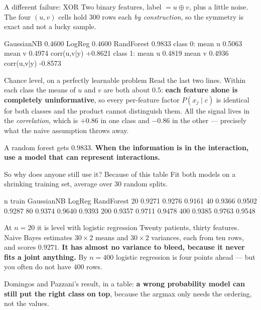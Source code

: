 \documentclass[aspectratio=169]{beamer}
\begin{document}
\begin{frame}[fragile,shrink=7]{A different failure: XOR}
Two binary features, label $= u \oplus v$, plus a little noise. The four
$(u,v)$ cells hold $300$ rows each \emph{by construction}, so the symmetry is
exact and not a lucky sample.
\begin{outblk}
   GaussianNB   0.4600
   LogReg       0.4600
   RandForest   0.9833
      class 0: mean u 0.5063  mean v 0.4974  corr(u,v|y) +0.8621
      class 1: mean u 0.4819  mean v 0.4936  corr(u,v|y) -0.8573
\end{outblk}
\begin{alertblock}{Chance level, on a perfectly learnable problem}
  \footnotesize Read the last two lines. Within each class the means of $u$
  and $v$ are both about $0.5$: \textbf{each feature alone is completely
  uninformative}, so every per-feature factor $P(x_j \mid c)$ is identical
  for both classes and the product cannot distinguish them. All the signal
  lives in the \emph{correlation}, which is $+0.86$ in one class and $-0.86$
  in the other --- precisely what the naive assumption throws away.
\end{alertblock}
\begin{center}\small
  A random forest gets $0.9833$. \textbf{When the information is in the
  interaction, use a model that can represent interactions.}
\end{center}
\end{frame}

\begin{frame}[fragile,shrink=7]{So why does anyone still use it? Because of
this table}
Fit both models on a shrinking training set, average over $30$ random splits.
\begin{outblk}
    n train  GaussianNB    LogReg  RandForest
         20      0.9271    0.9276      0.9161
         40      0.9366    0.9502      0.9287
         80      0.9374    0.9640      0.9393
        200      0.9357    0.9711      0.9478
        400      0.9385    0.9763      0.9548
\end{outblk}
\begin{alertblock}{At $n = 20$ it is level with logistic regression}
  \footnotesize Twenty patients, thirty features. Naive Bayes estimates
  $30 \times 2$ means and $30 \times 2$ variances, each from ten rows, and
  scores $0.9271$. \textbf{It has almost no variance to bleed, because it
  never fits a joint anything.} By $n = 400$ logistic regression is four
  points ahead --- but you often do not have $400$ rows.
\end{alertblock}
\begin{center}\small
  Domingos and Pazzani's result, in a table: \textbf{a wrong probability
  model can still put the right class on top}, because the argmax only needs
  the ordering, not the values.
\end{center}
\end{frame}
\end{document}
